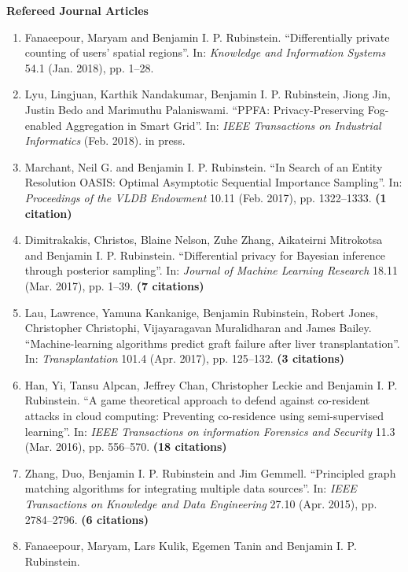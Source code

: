 \documentclass[a4paper,12pt]{article}
\begin{document}
\noindent\textbf{Refereed Journal Articles}

\begin{enumerate}
\setcounter{enumi}{\value{list}}

\item Fanaeepour, Maryam and Benjamin I. P. Rubinstein.
``Differentially private counting of users' spatial regions''.
In: \emph{Knowledge and Information Systems} 54.1 (Jan. 2018), pp. 1--28.

\item Lyu, Lingjuan, Karthik Nandakumar, Benjamin I. P. Rubinstein, Jiong Jin, Justin Bedo and Marimuthu Palaniswami.
``PPFA: Privacy-Preserving Fog-enabled Aggregation in Smart Grid''.
In: \emph{IEEE Transactions on Industrial Informatics} (Feb. 2018). in press.

\item Marchant, Neil G. and Benjamin I. P. Rubinstein.
``In Search of an Entity Resolution OASIS: Optimal Asymptotic Sequential Importance Sampling''.
In: \emph{Proceedings of the VLDB Endowment} 10.11 (Feb. 2017), pp. 1322--1333.
 \textbf{(1 citation)}
\item Dimitrakakis, Christos, Blaine Nelson, Zuhe Zhang, Aikateirni Mitrokotsa and Benjamin I. P. Rubinstein.
``Differential privacy for Bayesian inference through posterior sampling''.
In: \emph{Journal of Machine Learning Research} 18.11 (Mar. 2017), pp. 1--39.
 \textbf{(7 citations)}
\item Lau, Lawrence, Yamuna Kankanige, Benjamin Rubinstein, Robert Jones, Christopher Christophi, Vijayaragavan Muralidharan and James Bailey.
``Machine-learning algorithms predict graft failure after liver transplantation''.
In: \emph{Transplantation} 101.4 (Apr. 2017), pp. 125--132.
 \textbf{(3 citations)}
\item Han, Yi, Tansu Alpcan, Jeffrey Chan, Christopher Leckie and Benjamin I. P. Rubinstein.
``A game theoretical approach to defend against co-resident attacks in cloud computing: Preventing co-residence using semi-supervised learning''.
In: \emph{IEEE Transactions on information Forensics and Security} 11.3 (Mar. 2016), pp. 556--570.
 \textbf{(18 citations)}
\item Zhang, Duo, Benjamin I. P. Rubinstein and Jim Gemmell.
``Principled graph matching algorithms for integrating multiple data sources''.
In: \emph{IEEE Transactions on Knowledge and Data Engineering} 27.10 (Apr. 2015), pp. 2784--2796.
 \textbf{(6 citations)}
\item Fanaeepour, Maryam, Lars Kulik, Egemen Tanin and Benjamin I. P. Rubinstein.

\end{enumerate}
\end{document}
